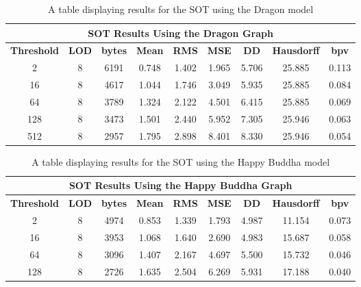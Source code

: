 \begin{table}[h]
\begin{tabular}[c]{|c|c|c|c|c|c|c|c|c|}
\hline\multicolumn{9}{|c|}{\textbf{SOT Results Using the Dragon Graph}}\\
\hline
\textbf{Threshold} & \textbf{LOD} & \textbf{bytes} & \textbf{Mean} & \textbf{RMS} & \textbf{MSE} & \textbf{DD} & \textbf{Hausdorff} & \textbf{bpv}\\
\hline
2 & 8 & 6191 & 0.748 & 1.402 & 1.965 & 5.706 & 25.885 & 0.113\\
\hline
16 & 8 & 4617 & 1.044 & 1.746 & 3.049 & 5.935 & 25.885 & 0.084\\
\hline
64 & 8 & 3789 & 1.324 & 2.122 & 4.501 & 6.415 & 25.885 & 0.069\\
\hline
128 & 8 & 3473 & 1.501 & 2.440 & 5.952 & 7.305 & 25.946 & 0.063\\
\hline
512 & 8 & 2957 & 1.795 & 2.898 & 8.401 & 8.330 & 25.946 & 0.054\\
\hline
\end{tabular}
\caption{A table displaying results for the SOT using the Dragon model}
\label{table:SOTTableDragon}
\end{table}

\begin{table}[h]
\begin{tabular}[c]{|c|c|c|c|c|c|c|c|c|}
\hline\multicolumn{9}{|c|}{\textbf{SOT Results Using the Happy Buddha Graph}}\\
\hline
\textbf{Threshold} & \textbf{LOD} & \textbf{bytes} & \textbf{Mean} & \textbf{RMS} & \textbf{MSE} & \textbf{DD} & \textbf{Hausdorff} & \textbf{bpv}\\
\hline
2 & 8 & 4974 & 0.853 & 1.339 & 1.793 & 4.987 & 11.154 & 0.073\\
\hline
16 & 8 & 3953 & 1.068 & 1.640 & 2.690 & 4.983 & 15.687 & 0.058\\
\hline
64 & 8 & 3096 & 1.407 & 2.167 & 4.697 & 5.500 & 15.732 & 0.046\\
\hline
128 & 8 & 2726 & 1.635 & 2.504 & 6.269 & 5.931 & 17.188 & 0.040\\
\hline
\end{tabular}
\caption{A table displaying results for the SOT using the Happy Buddha model}
\label{table:SOTTableHappy}
\end{table}
